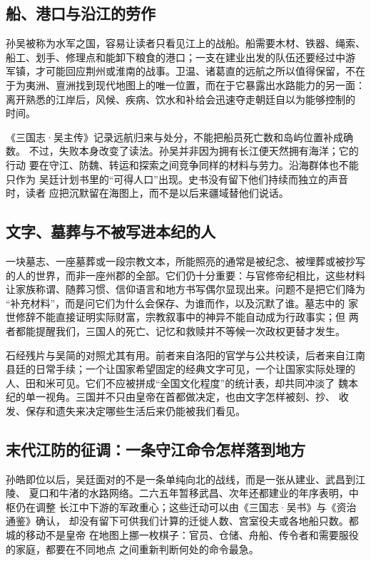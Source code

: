 \subsection{船、港口与沿江的劳作}

孙吴被称为水军之国，容易让读者只看见江上的战船。船需要木材、铁器、绳索、
船工、划手、修理点和能卸下粮食的港口；一支在建业出发的队伍还要经过中游
军镇，才可能回应荆州或淮南的战事。卫温、诸葛直的远航之所以值得保留，不在
于为夷洲、亶洲找到现代地图上的唯一位置，而在于它暴露出水路能力的另一面：
离开熟悉的江岸后，风候、疾病、饮水和补给会迅速夺走朝廷自以为能够控制的
时间。

《三国志·吴主传》记录远航归来与处分，不能把船员死亡数和岛屿位置补成确数。
不过，失败本身改变了读法。孙吴并非因为拥有长江便天然拥有海洋；它的行动
要在守江、防魏、转运和探索之间竞争同样的材料与劳力。沿海群体也不能只作为
吴廷计划书里的“可得人口”出现。史书没有留下他们持续而独立的声音时，读者
应把沉默留在海图上，而不是以后来疆域替他们说话。

\subsection{文字、墓葬与不被写进本纪的人}

一块墓志、一座墓葬或一段宗教文本，所能照亮的通常是被纪念、被埋葬或被抄写
的人的世界，而非一座州郡的全部。它们仍十分重要：与官修帝纪相比，这些材料
让家族称谓、随葬习惯、信仰语言和地方书写偶尔显现出来。问题不是把它们降为
“补充材料”，而是问它们为什么会保存、为谁而作，以及沉默了谁。墓志中的
家世修辞不能直接证明实际财富，宗教叙事中的神异不能自动成为行政事实；但
两者都能提醒我们，三国人的死亡、记忆和救赎并不等候一次政权更替才发生。

石经残片与吴简的对照尤其有用。前者来自洛阳的官学与公共校读，后者来自江南
县廷的日常手续；一个让国家希望固定的经典文字可见，一个让国家实际处理的
人、田和米可见。它们不应被拼成“全国文化程度”的统计表，却共同冲淡了
魏本纪的单一视角。三国并不只由皇帝在首都做决定，也由文字怎样被刻、抄、
收发、保存和遗失来决定哪些生活后来仍能被我们看见。

\subsection{末代江防的征调：一条守江命令怎样落到地方}

孙皓即位以后，吴廷面对的不是一条单纯向北的战线，而是一张从建业、武昌到江陵、
夏口和牛渚的水路网络。二六五年暂移武昌、次年还都建业的年序表明，中枢仍在调整
长江中下游的军政重心；这些迁动可以由《三国志·吴书》与《资治通鉴》确认，
却没有留下可供我们计算的迁徙人数、宫室役夫或各地船只数。都城的移动不是皇帝
在地图上挪一枚棋子：官员、仓储、舟船、传令者和需要服役的家庭，都要在不同地点
之间重新判断何处的命令最急。

